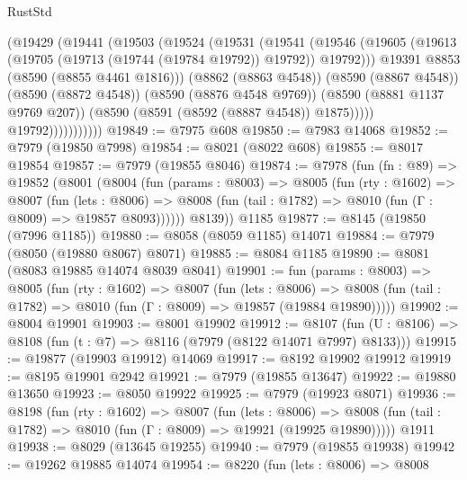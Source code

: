 \begin{lexlean}{RustStd}
\begin{coremodule}
                      (@19429
                        (@19441
                          (@19503
                            (@19524
                              (@19531
                                (@19541
                                  (@19546
                                    (@19605
                                      (@19613
                                        (@19705 (@19713 (@19744 (@19784 @19792)) @19792))
                                        @19792)))
                                  @19391
                                  @8853
                                  (@8590 (@8855 @4461 @1816)))
                                (@8862 (@8863 @4548))
                                (@8590 (@8867 @4548))
                                (@8590 (@8872 @4548))
                                (@8590 (@8876 @4548 @9769))
                                (@8590 (@8881 @1137 @9769 @207))
                                (@8590 (@8591 (@8592 (@8887 @4548)) @1875)))))
                          @19792)))))))))))
@19849 := @7975 @608
@19850 := @7983 @14068
@19852 := @7979 (@19850 @7998)
@19854 := @8021 (@8022 @608)
@19855 := @8017 @19854
@19857 := @7979 (@19855 @8046)
@19874 := @7978
    (fun (fn : @89) =>
    @19852
      (@8001
        (@8004
          (fun (params : @8003) =>
          @8005
            (fun (rty : @1602) =>
            @8007
              (fun (lets : @8006) =>
              @8008 (fun (tail : @1782) => @8010 (fun (Γ : @8009) => @19857 @8093))))))
        @8139))
    @1185
@19877 := @8145 (@19850 (@7996 @1185))
@19880 := @8058 (@8059 @1185) @14071
@19884 := @7979 (@8050 (@19880 @8067) @8071)
@19885 := @8084 @1185
@19890 := @8081 (@8083 @19885 @14074 @8039 @8041)
@19901 := fun (params : @8003) =>
  @8005
    (fun (rty : @1602) =>
    @8007
      (fun (lets : @8006) =>
      @8008 (fun (tail : @1782) => @8010 (fun (Γ : @8009) => @19857 (@19884 @19890)))))
@19902 := @8004 @19901
@19903 := @8001 @19902
@19912 := @8107
    (fun (U : @8106) => @8108 (fun (t : @7) => @8116 (@7979 (@8122 @14071 @7997) @8133)))
@19915 := @19877 (@19903 @19912) @14069
@19917 := @8192 @19902 @19912
@19919 := @8195 @19901 @2942
@19921 := @7979 (@19855 @13647)
@19922 := @19880 @13650
@19923 := @8050 @19922
@19925 := @7979 (@19923 @8071)
@19936 := @8198
    (fun (rty : @1602) =>
    @8007
      (fun (lets : @8006) =>
      @8008 (fun (tail : @1782) => @8010 (fun (Γ : @8009) => @19921 (@19925 @19890)))))
    @1911
@19938 := @8029 (@13645 @19255)
@19940 := @7979 (@19855 @19938)
@19942 := @19262 @19885 @14074
@19954 := @8220
    (fun (lets : @8006) =>
    @8008

\end{coremodule}
\end{lexlean}
